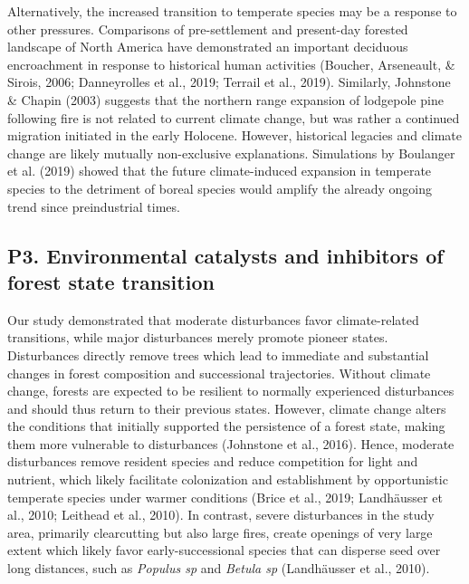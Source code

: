 \documentclass[a4paperpaper,]{article}
\begin{document}
Alternatively, the increased transition to temperate species may be a
response to other pressures. Comparisons of pre-settlement and
present-day forested landscape of North America have demonstrated an
important deciduous encroachment in response to historical human
activities (Boucher, Arseneault, \& Sirois, 2006; Danneyrolles et al.,
2019; Terrail et al., 2019). Similarly, Johnstone \& Chapin (2003)
suggests that the northern range expansion of lodgepole pine following
fire is not related to current climate change, but was rather a
continued migration initiated in the early Holocene. However, historical
legacies and climate change are likely mutually non-exclusive
explanations. Simulations by Boulanger et al. (2019) showed that the
future climate-induced expansion in temperate species to the detriment
of boreal species would amplify the already ongoing trend since
preindustrial times.

\hypertarget{p3.-environmental-catalysts-and-inhibitors-of-forest-state-transition}{%
\subsection{P3. Environmental catalysts and inhibitors of forest state
transition}\label{p3.-environmental-catalysts-and-inhibitors-of-forest-state-transition}}

Our study demonstrated that moderate disturbances favor climate-related
transitions, while major disturbances merely promote pioneer states.
Disturbances directly remove trees which lead to immediate and
substantial changes in forest composition and successional trajectories.
Without climate change, forests are expected to be resilient to normally
experienced disturbances and should thus return to their previous
states. However, climate change alters the conditions that initially
supported the persistence of a forest state, making them more vulnerable
to disturbances (Johnstone et al., 2016). Hence, moderate disturbances
remove resident species and reduce competition for light and nutrient,
which likely facilitate colonization and establishment by opportunistic
temperate species under warmer conditions (Brice et al., 2019;
Landhäusser et al., 2010; Leithead et al., 2010). In contrast, severe
disturbances in the study area, primarily clearcutting but also large
fires, create openings of very large extent which likely favor
early-successional species that can disperse seed over long distances,
such as \emph{Populus sp} and \emph{Betula sp} (Landhäusser et al.,
2010).
\end{document}
